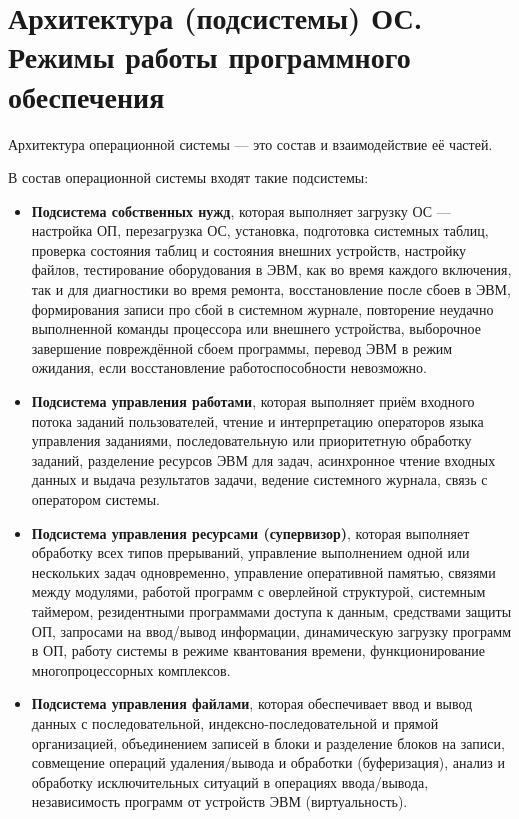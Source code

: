 \documentclass[a4paper, 10pt, notitlepage, pdftex,headsepline]{scrartcl}
\begin{document}
\section{Архитектура (подсистемы) ОС. Режимы работы программного обеспечения}
  Архитектура операционной системы --- это состав и взаимодействие её частей.

  В состав операционной системы входят такие подсистемы:
  \begin{itemize}
    \item \textbf{Подсистема собственных нужд}, которая выполняет загрузку ОС
      --- настройка ОП, перезагрузка ОС, установка, подготовка системных таблиц,
      проверка состояния таблиц и состояния внешних устройств, настройку файлов,
      тестирование оборудования в ЭВМ, как во время каждого включения, так и для
      диагностики во время ремонта, восстановление после сбоев в ЭВМ,
      формирования записи про сбой в системном журнале, повторение неудачно
      выполненной команды процессора или внешнего устройства, выборочное
      завершение повреждённой сбоем программы, перевод ЭВМ в режим ожидания,
      если восстановление работоспособности невозможно.
    \item \textbf{Подсистема управления работами}, которая выполняет приём
      входного потока заданий пользователей, чтение и интерпретацию операторов
      языка управления заданиями, последовательную или приоритетную обработку
      заданий, разделение ресурсов ЭВМ для задач, асинхронное чтение входных
      данных и выдача результатов задачи, ведение системного журнала, связь с
      оператором системы.
    \item \textbf{Подсистема управления ресурсами (супервизор)}, которая
      выполняет обработку всех типов прерываний, управление выполнением одной
      или нескольких задач одновременно, управление оперативной памятью, связями
      между модулями, работой программ с оверлейной структурой, системным
      таймером, резидентными программами доступа к данным, средствами защиты ОП,
      запросами на ввод/вывод информации, динамическую загрузку программ в ОП,
      работу системы в режиме квантования времени, функционирование
      многопроцессорных комплексов.
    \item \textbf{Подсистема управления файлами}, которая обеспечивает ввод и
      вывод данных с последовательной, индексно-последовательной и прямой
      организацией, объединением записей в блоки и разделение блоков на записи,
      совмещение операций удаления/вывода и обработки (буферизация), анализ и
      обработку исключительных ситуаций в операциях ввода/вывода, независимость
      программ от устройств ЭВМ (виртуальность).
  \end{itemize}
\end{document}
